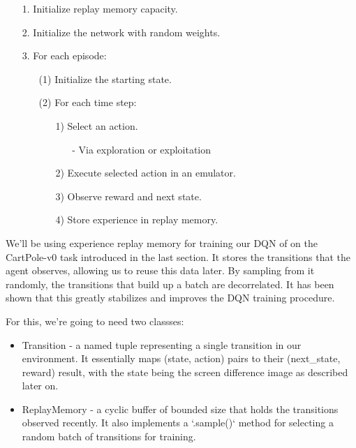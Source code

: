 \begin{itemize}
\setlength{\parskip}{0pt}
\item[1.]
Initialize replay memory capacity.

\item[2.]
Initialize the network with random weights.

\item[3.]
For each episode:
	\begin{itemize}
	\item[(1)]
	Initialize the starting state.

	\item[(2)]
	For each time step:
		\begin{itemize}
		\item[1)]
		Select an action.
			\begin{itemize}
			\item[-]
			Via exploration or exploitation
			\end{itemize}

		\item[2)]
		Execute selected action in an emulator.

		\item[3)]
		Observe reward and next state.

		\item[4)]
		Store experience in replay memory.
		\end{itemize}
	\end{itemize}
\end{itemize}

We’ll be using experience replay memory for training our DQN of on the CartPole-v0 task 
introduced in the last section. It stores the transitions that the agent observes, 
allowing us to reuse this data later. By sampling from it randomly, the transitions that 
build up a batch are decorrelated. It has been shown that this greatly stabilizes and 
improves the DQN training procedure.

For this, we’re going to need two classses:

\begin{itemize}
\setlength{\parskip}{0pt}
\item
Transition - a named tuple representing a single transition in our environment. It 
essentially maps (state, action) pairs to their (next\_state, reward) result, with the 
state being the screen difference image as described later on.

\item
ReplayMemory - a cyclic buffer of bounded size that holds the transitions observed 
recently. It also implements a `.sample()` method for selecting a random batch of 
transitions for training.
\end{itemize}

